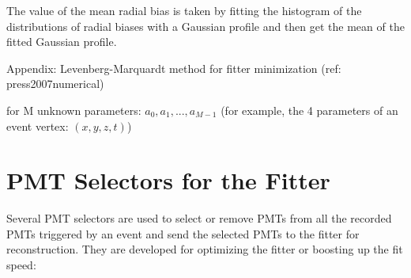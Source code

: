 The value of the mean radial bias is taken by fitting the histogram of the distributions of radial biases with a Gaussian profile and then get the mean of the fitted Gaussian profile.



Appendix: Levenberg-Marquardt method for fitter minimization
(ref: press2007numerical)

for M unknown parameters: $a_0, a_1, ... , a_{M-1}$ (for example, the 4 parameters of an event vertex: $(x,y,z,t)$)


\section{PMT Selectors for the Fitter}
Several PMT selectors are used to select or remove PMTs from all the recorded PMTs triggered by an event and send the selected PMTs to the fitter for reconstruction. They are developed for optimizing the fitter or boosting up the fit speed:

